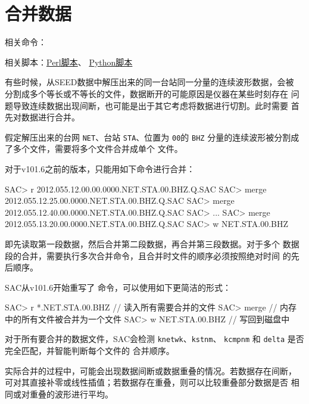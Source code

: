 \section{合并数据}
相关命令：

相关脚本：\hyperref[subsec:merge-in-perl]{Perl脚本}、
          \hyperref[subsec:merge-in-python]{Python脚本}

有些时候，从SEED数据中解压出来的同一台站同一分量的连续波形数据，会被
分割成多个等长或不等长的文件，数据断开的可能原因是仪器在某些时刻存在
问题导致连续数据出现间断，也可能是出于其它考虑将数据进行切割。此时需要
首先对数据进行合并。

假定解压出来的台网 \texttt{NET}、台站 \texttt{STA}、位置为 \texttt{00}的
\texttt{BHZ} 分量的连续波形被分割成了多个文件，需要将多个文件合并成单个
文件。

对于v101.6之前的版本，只能用如下命令进行合并：
\begin{SACCode}
SAC> r 2012.055.12.00.00.0000.NET.STA.00.BHZ.Q.SAC
SAC> merge 2012.055.12.25.00.0000.NET.STA.00.BHZ.Q.SAC
SAC> merge 2012.055.12.40.00.0000.NET.STA.00.BHZ.Q.SAC
SAC> ...
SAC> merge 2012.055.13.20.00.0000.NET.STA.00.BHZ.Q.SAC
SAC> w NET.STA.00.BHZ
\end{SACCode}
即先读取第一段数据，然后合并第二段数据，再合并第三段数据。对于多个
数据段的合并，需要执行多次合并命令，且合并时文件的顺序必须按照绝对时间
的先后顺序。

SAC从v101.6开始重写了  命令，可以使用如下更简洁的形式：
\begin{SACCode}
SAC> r *.NET.STA.00.BHZ        // 读入所有需要合并的文件
SAC> merge                     // 内存中的所有文件被合并为一个文件
SAC> w NET.STA.00.BHZ          // 写回到磁盘中
\end{SACCode}

对于所有要合并的数据文件，SAC会检测 \texttt{knetwk}、\texttt{kstnm}、
\texttt{kcmpnm} 和 \texttt{delta} 是否完全匹配，并智能判断每个文件的
合并顺序。

实际合并的过程中，可能会出现数据间断或数据重叠的情况。若数据存在间断，
可对其直接补零或线性插值；若数据存在重叠，则可以比较重叠部分数据是否
相同或对重叠的波形进行平均。
